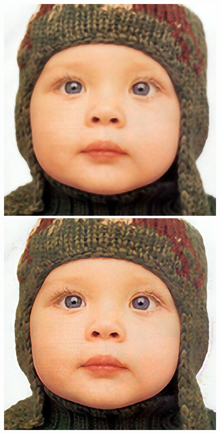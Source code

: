 \documentclass[runningheads]{llncs}
\begin{document}
\begin{figure}[t]
  \includegraphics[trim={100px 280px 300px 160px},width=\mywidth,clip]{set5_1_srcnn.png}
  \includegraphics[trim={100px 280px 300px 160px},width=\mywidth,clip]{set5_1_feat.png} \\

\end{figure}
\end{document}
